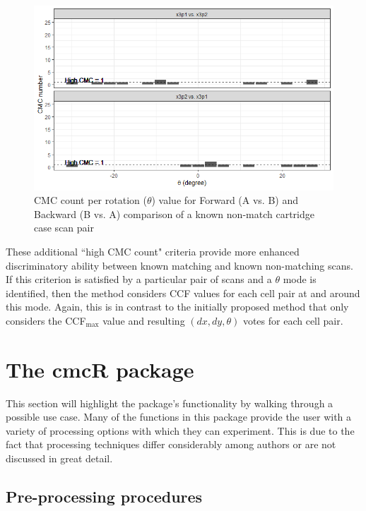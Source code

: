 \begin{figure}[htbp]
  \centering
	\includegraphics[width = .7\textwidth]{images/knmCMCpertheta.png}
	\caption{CMC count per rotation ($\theta$) value for Forward (A vs. B) and Backward (B vs. A) comparison of a known non-match cartridge case scan pair}
 	\label{fig:knmCMCPerTheta}
\end{figure}

These additional ``high CMC count" criteria provide more enhanced discriminatory ability between known matching and known non-matching scans. If this criterion is satisfied by a particular pair of scans and a $\theta$ mode is identified, then the method considers CCF values for each cell pair at and around this mode. Again, this is in contrast to the initially proposed method that only considers the CCF$_{\max}$ value and resulting $(dx,dy,\theta)$ votes for each cell pair.



\section{The cmcR package}

This section will highlight the  package's functionality by walking through a possible use case. Many of the functions in this package provide the user with a variety of processing options with which they can experiment. This is due to the fact that processing techniques differ considerably among authors or are not discussed in great detail.

\subsection{Pre-processing procedures}


